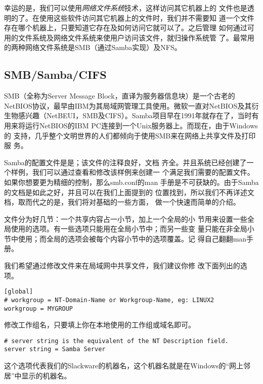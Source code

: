 幸运的是，我们可以使用\textit{网络文件系统}技术，这样访问其它机器上的
文件也是透明的了。在使用这些软件访问其它机器上的文件时，我们并不需要知
道一个文件存在哪个机器上，只要知道它存在及如何访问它就可以了。之后管理
如何通过可用的文件系统及网络文件系统来使用户访问该文件，就归操作系统管
了。最常用的两种网络文件系统是SMB（通过Samba实现）及NFS。

\subsection{SMB/Samba/CIFS}
\label{sec:networkConfiguration:networkFileSystem:samba}
SMB（全称为Server Message Block，直译为服务器信息块）是一个古老的
NetBIOS协议，最早由IBM为其局域网管理工具使用。微软一直对NetBIOS及其衍
生物感兴趣（NetBEUI，SMB及CIFS）。Samba项目早在1991年就存在了，当时有
用来将运行NetBIOS的IBM PC连接到一个Unix服务器上。而现在，由于Windows的
支持，几乎整个文明世界的人们都倾向于使用SMB来在网络上共享文件及打印服
务。

Samba的配置文件是是；该文件的注释良好，文档
齐全。并且系统已经创建了一个样例，我们可以通过查看和修改该样例来创建一
个满足我们需要的配置文件。如果你想要更为精细的控制，那么smb.conf的man
手册是不可获缺的。由于Samba的文档是如此之好，并且可以在我们上面提到的
位置找到，所以我们不再详述文档，取而代之的是，我们将对基础的一些方面，
做一个快速而简单的介绍。

文件分为好几节：一个共享内容占一小节，加上一个全局的小
节用来设置一些全局使用的选项。有一些选项只能用在全局小节中；而另一些变
量只能在非全局小节中使用；而全局的选项会被每个内容小节中的选项覆盖。记
得自己翻翻man手册。

我们希望通过修改文件来在局域网中共享文件，我们建议你修
改下面列出的选项。

\begin{Verbatim}[frame=single,commandchars=\\\{\}]
[global]
# workgroup = NT-Domain-Name or Workgroup-Name, eg: LINUX2
workgroup = MYGROUP
\end{Verbatim}

修改工作组名，只要填上你在本地使用的工作组或域名即可。

\begin{Verbatim}[frame=single,commandchars=\\\{\}]
# server string is the equivalent of the NT Description field.
server string = Samba Server
\end{Verbatim}
这个选项代表我们的Slackware的机器名，这个机器名就是在Windows的“网上邻
居”中显示的机器名。

